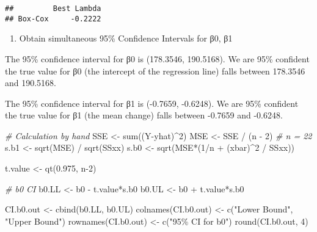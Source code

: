 \documentclass[
]{article}
\newenvironment{Shaded}{\begin{snugshade}}{\end{snugshade}}
\newcommand{\CommentTok}[1]{\textcolor[rgb]{0.56,0.35,0.01}{\textit{#1}}}
\newcommand{\DecValTok}[1]{\textcolor[rgb]{0.00,0.00,0.81}{#1}}
\newcommand{\FloatTok}[1]{\textcolor[rgb]{0.00,0.00,0.81}{#1}}
\newcommand{\FunctionTok}[1]{\textcolor[rgb]{0.00,0.00,0.00}{#1}}
\newcommand{\NormalTok}[1]{#1}
\newcommand{\OtherTok}[1]{\textcolor[rgb]{0.56,0.35,0.01}{#1}}
\newcommand{\SpecialCharTok}[1]{\textcolor[rgb]{0.00,0.00,0.00}{#1}}
\newcommand{\StringTok}[1]{\textcolor[rgb]{0.31,0.60,0.02}{#1}}
\providecommand{\tightlist}{%
  \setlength{\itemsep}{0pt}\setlength{\parskip}{0pt}}
\begin{document}
\begin{verbatim}
##         Best Lambda
## Box-Cox     -0.2222
\end{verbatim}

\begin{enumerate}
\def\labelenumi{\alph{enumi})}
\setcounter{enumi}{10}
\tightlist
\item
  Obtain simultaneous 95\% Confidence Intervals for β0, β1
\end{enumerate}

The 95\% confidence interval for β0 is (178.3546, 190.5168). We are 95\%
confident the true value for β0 (the intercept of the regression line)
falls between 178.3546 and 190.5168.

The 95\% confidence interval for β1 is (-0.7659, -0.6248). We are 95\%
confident the true value for β1 (the mean change) falls between -0.7659
and -0.6248.

\begin{Shaded}
\begin{Highlighting}[]
\CommentTok{\# Calculation by hand}
\NormalTok{SSE }\OtherTok{\textless{}{-}} \FunctionTok{sum}\NormalTok{((Y}\SpecialCharTok{{-}}\NormalTok{yhat)}\SpecialCharTok{\^{}}\DecValTok{2}\NormalTok{)}
\NormalTok{MSE }\OtherTok{\textless{}{-}}\NormalTok{ SSE }\SpecialCharTok{/}\NormalTok{ (n }\SpecialCharTok{{-}} \DecValTok{2}\NormalTok{) }\CommentTok{\# n = 22}
\NormalTok{s.b1 }\OtherTok{\textless{}{-}} \FunctionTok{sqrt}\NormalTok{(MSE) }\SpecialCharTok{/} \FunctionTok{sqrt}\NormalTok{(SSxx)}
\NormalTok{s.b0 }\OtherTok{\textless{}{-}} \FunctionTok{sqrt}\NormalTok{(MSE}\SpecialCharTok{*}\NormalTok{(}\DecValTok{1}\SpecialCharTok{/}\NormalTok{n }\SpecialCharTok{+}\NormalTok{ (xbar)}\SpecialCharTok{\^{}}\DecValTok{2} \SpecialCharTok{/}\NormalTok{ SSxx))}

\NormalTok{t.value }\OtherTok{\textless{}{-}} \FunctionTok{qt}\NormalTok{(}\FloatTok{0.975}\NormalTok{, n}\DecValTok{{-}2}\NormalTok{)}

\CommentTok{\# b0 CI}
\NormalTok{b0.LL }\OtherTok{\textless{}{-}}\NormalTok{ b0 }\SpecialCharTok{{-}}\NormalTok{ t.value}\SpecialCharTok{*}\NormalTok{s.b0}
\NormalTok{b0.UL }\OtherTok{\textless{}{-}}\NormalTok{ b0 }\SpecialCharTok{+}\NormalTok{ t.value}\SpecialCharTok{*}\NormalTok{s.b0}

\NormalTok{CI.b0.out }\OtherTok{\textless{}{-}} \FunctionTok{cbind}\NormalTok{(b0.LL, b0.UL)}
\FunctionTok{colnames}\NormalTok{(CI.b0.out) }\OtherTok{\textless{}{-}} \FunctionTok{c}\NormalTok{(}\StringTok{"Lower Bound"}\NormalTok{, }\StringTok{"Upper Bound"}\NormalTok{)}
\FunctionTok{rownames}\NormalTok{(CI.b0.out) }\OtherTok{\textless{}{-}} \FunctionTok{c}\NormalTok{(}\StringTok{"95\% CI for b0"}\NormalTok{)}
\FunctionTok{round}\NormalTok{(CI.b0.out, }\DecValTok{4}\NormalTok{)}
\end{Highlighting}
\end{Shaded}
\end{document}
